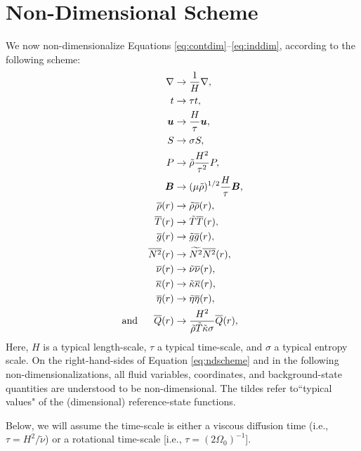 \documentclass[12pt]{article}
\numberwithin{equation}{section}
\begin{document}
	\section{Non-Dimensional Scheme}
	We now non-dimensionalize Equations \eqref{eq:contdim}--\eqref{eq:inddim}, according to the following scheme:
	\begin{subequations}\label{eq:ndscheme}
	\begin{align}
		\nabla &\rightarrow \frac{1}{H}\nabla\label{eq:ndschemenabla},\\
		t &\rightarrow \tau t,\\
		\bm{u} &\rightarrow \frac{H}{\tau} \bm{u},\\
		S &\rightarrow \sigma S,\\
		P &\rightarrow \tilde{\rho} \frac{H^2}{\tau^2} P,\\
		\bm{B} &\rightarrow (\mu\tilde{\rho})^{1/2}\frac{H}{\tau} \bm{B} \label{eq:ndschemeb},\\ 
		\overline{\rho}(r) &\rightarrow \tilde{\rho} \overline{\rho}(r)  \label{eq:ndschemerho}, \\
		\overline{T}(r) &\rightarrow \tilde{T} \overline{T}(r),\\
		\overline{g}(r) &\rightarrow \tilde{g} \overline{g}(r),\\
		\overline{N^2}(r) &\rightarrow \widetilde{N^2} \overline{N^2}(r),\\
		\overline{\nu}(r) &\rightarrow \tilde{\nu}\overline{\nu}(r),\\
		\overline{\kappa}(r) &\rightarrow \tilde{\kappa}\overline{\kappa}(r),\\
		 \overline{\eta}(r) &\rightarrow \tilde{\eta}\overline{\eta}(r),\\ \label{eq:ndschemeeta} 
		\text{and}\ \ \ \ \  \overline{Q}(r) &\rightarrow \frac{H^2}{\tilde{\rho}\tilde{T}\tilde{\kappa} \sigma} \overline{Q}(r),
	\end{align}
	\end{subequations}
	Here, $H$ is a typical length-scale, $\tau$ a typical time-scale, and $\sigma$ a typical entropy scale. On the right-hand-sides of Equation \eqref{eq:ndscheme} and in the following non-dimensionalizations, all fluid variables, coordinates, and background-state quantities are understood to be non-dimensional. The tildes refer to``typical values" of the (dimensional) reference-state functions.
	
	Below, we will assume the time-scale is either a viscous diffusion time (i.e., $\tau=H^2/\tilde{\nu}$) or a rotational time-scale [i.e., $\tau=(2\Omega_0)^{-1}$]. %
	
\end{document}
